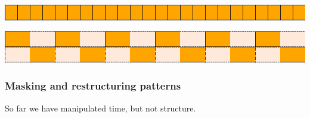 \includegraphics{../figures/fig3.pdf}\\

\begin{Shaded}
\begin{Highlighting}[]
\OtherTok{=}\NormalTok{) }\OperatorTok{$}
\end{Highlighting}
\end{Shaded}

\includegraphics{../figures/fig4.pdf}\\

\subsubsection{Masking and restructuring
patterns}\label{masking-and-restructuring-patterns}

So far we have manipulated time, but not structure.

\begin{Shaded}
\begin{Highlighting}[]
 
\OtherTok{=}  \OperatorTok{$} \NormalTok{ []}

  \OtherTok{{-}\textgreater{}} \OtherTok{{-}\textgreater{}} 
\OtherTok{=}
\NormalTok{ \_ }\OtherTok{=}

   \OtherTok{{-}\textgreater{}} \OtherTok{{-}\textgreater{}} 
\OtherTok{=}\OtherTok{{-}\textgreater{}}

   \OtherTok{{-}\textgreater{}} \OtherTok{{-}\textgreater{}} 
\OtherTok{=}\OtherTok{{-}\textgreater{}}
\end{Highlighting}
\end{Shaded}

